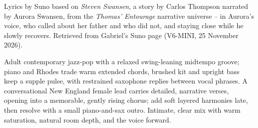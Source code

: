 
\begin{notes}
Lyrics by Suno based on \emph{Steven Swansen}, a story by Carlos Thompson narrated by Aurora Swansen, from the \emph{Thomas' Entourage} narrative universe -- in Aurora's voice, who called about her father and who did not, and staying close while he slowly recovers. Retrieved from Gabriel's Suno page (V6-MINI, 25 November 2026).
\end{notes}
\begin{style}
Adult contemporary jazz-pop with a relaxed swing-leaning midtempo groove; piano and Rhodes trade warm extended chords, brushed kit and upright bass keep a supple pulse, with restrained saxophone replies between vocal phrases. A conversational New England female lead carries detailed, narrative verses, opening into a memorable, gently rising chorus; add soft layered harmonies late, then resolve with a small piano-and-sax outro. Intimate, clear mix with warm saturation, natural room depth, and the voice forward.
\end{style}

